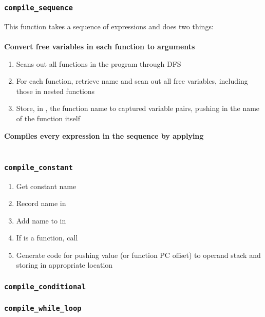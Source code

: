\subsubsection{\texttt{compile\_sequence}}
This function takes a sequence of expressions and does two things: \\\\
\textbf{Convert free variables in each function to arguments}
\begin{enumerate}
    \item Scans out all functions in the program through DFS
    \item For each function, retrieve name and scan out all free variables, including those in nested functions
    \item Store, in , the function name to captured variable pairs, pushing in the name of the function itself
\end{enumerate}
\textbf{Compiles every expression in the sequence by applying }\\\\
\begin{prooftree}
\end{prooftree}
\subsubsection{\texttt{compile\_constant}}
\begin{enumerate}
    \item Get constant name
    \item Record name in 
    \item Add name to in 
    \item If is a function, call 
    \item Generate code for pushing value (or function PC offset) to operand stack and storing in appropriate location
\end{enumerate}
\subsubsection{\texttt{compile\_conditional}}

\subsubsection{\texttt{compile\_while\_loop}}


